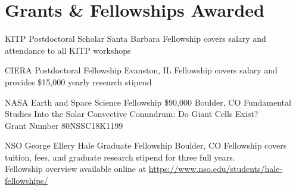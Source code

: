 \section{Grants \& Fellowships Awarded}

		{KITP Postdoctoral Scholar}
		{}
		{Santa Barbara}
		{}
		{Fellowship covers salary and attendance to all KITP workshops}

		{CIERA Postdoctoral Fellowship}
		{}
		{Evanston, IL}
		{}
		{Fellowship covers salary and provides \$15,000 yearly research stipend}

		{NASA Earth and Space Science Fellowship}
		{\$90,000}
		{Boulder, CO}
		{}
		{Fundamental Studies Into the Solar Convective Conundrum: Do Giant Cells Exist?\\
		 Grant Number 80NSSC18K1199}

		{NSO George Ellery Hale Graduate Fellowship}
		{}
		{Boulder, CO}
		{}
		{Fellowship covers tuition, fees, and graduate research stipend for three full years.\\
		 Fellowship overview available online at \href{https://www.nso.edu/students/hale-fellowships/}{https://www.nso.edu/students/hale-fellowships/}}
